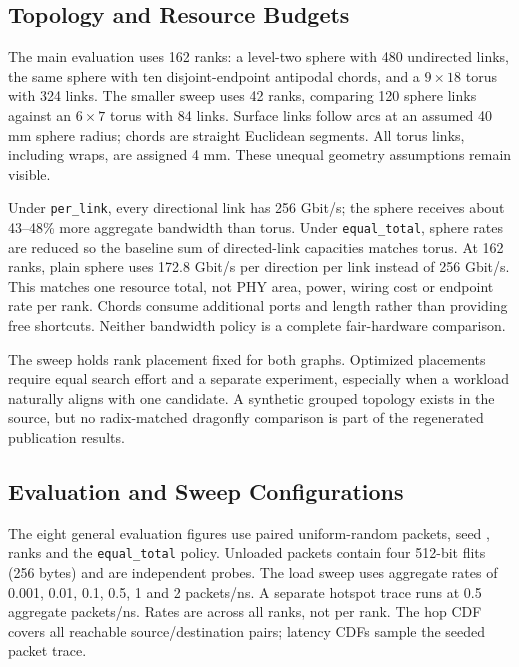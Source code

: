\documentclass[11pt,a4paper]{article}
\begin{document}
\subsection{Topology and Resource Budgets}

The main evaluation uses 162 ranks: a level-two sphere with 480 undirected
links, the same sphere with ten disjoint-endpoint antipodal chords, and a
$9\times18$ torus with 324 links. The smaller sweep uses 42 ranks, comparing
120 sphere links against an $6\times7$ torus with 84 links. Surface links
follow arcs at an assumed 40 mm sphere radius; chords are straight Euclidean
segments. All torus links, including wraps, are assigned 4 mm. These unequal
geometry assumptions remain visible.

Under \texttt{per\_link}, every directional link has 256 Gbit/s; the sphere
receives about 43--48\% more aggregate bandwidth than torus. Under
\texttt{equal\_total}, sphere rates are reduced so the baseline sum of
directed-link capacities matches torus. At 162 ranks, plain sphere uses
172.8 Gbit/s per direction per link instead of 256 Gbit/s. This matches one
resource total, not PHY area, power, wiring cost or endpoint rate per rank.
Chords consume additional ports and length rather than providing free
shortcuts. Neither bandwidth policy is a complete fair-hardware comparison.

The sweep holds rank placement fixed for both graphs. Optimized placements
require equal search effort and a separate experiment, especially when a
workload naturally aligns with one candidate. A synthetic grouped topology
exists in the source, but no radix-matched dragonfly comparison is part of
the regenerated publication results.

\subsection{Evaluation and Sweep Configurations}

The eight general evaluation figures use \EvaluationPacketCount{} paired
uniform-random packets, seed \EvaluationSeed{}, \EvaluationRankCount{}
ranks and the \texttt{equal\_total} policy. Unloaded packets contain four
512-bit flits (256 bytes) and are independent probes. The load sweep uses
aggregate rates of 0.001, 0.01, 0.1, 0.5, 1 and 2 packets/ns. A separate
hotspot trace runs at 0.5 aggregate packets/ns. Rates are across all ranks,
not per rank. The hop CDF covers all reachable source/destination pairs;
latency CDFs sample the seeded packet trace.
\end{document}
